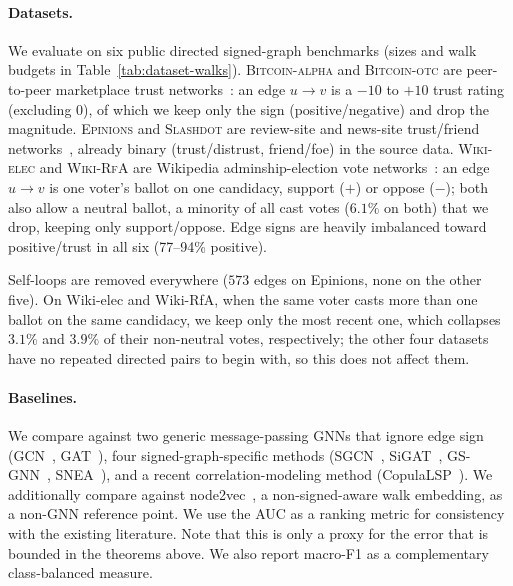 \documentclass[sigconf, review, anonymous]{acmart}
\theoremstyle{plain}
\theoremstyle{definition}
\begin{document}
\paragraph{Datasets.} We evaluate on six public directed signed-graph benchmarks (sizes and walk budgets in Table~\ref{tab:dataset-walks}). \textsc{Bitcoin-alpha} and \textsc{Bitcoin-otc} are peer-to-peer marketplace trust networks~\citep{kumar2016edge, kumar2018rev2}: an edge $u\to v$ is a $-10$ to $+10$ trust rating (excluding $0$), of which we keep only the sign (positive/negative) and drop the magnitude. \textsc{Epinions} and \textsc{Slashdot} are review-site and news-site trust/friend networks~\citep{leskovec2010signed}, already binary (trust/distrust, friend/foe) in the source data. \textsc{Wiki-elec} and \textsc{Wiki-RfA} are Wikipedia adminship-election vote networks~\citep{leskovec2010signed, leskovec2010predicting, west2014exploiting}: an edge $u\to v$ is one voter's ballot on one candidacy, support ($+$) or oppose ($-$); both also allow a neutral ballot, a minority of all cast votes ($6.1\%$ on both) that we drop, keeping only support/oppose. Edge signs are heavily imbalanced toward positive/trust in all six (77--94\% positive).

Self-loops are removed everywhere ($573$ edges on Epinions, none on the other five). On Wiki-elec and Wiki-RfA, when the same voter casts more than one ballot on the same candidacy, we keep only the most recent one, which collapses $3.1\%$ and $3.9\%$ of their non-neutral votes, respectively; the other four datasets have no repeated directed pairs to begin with, so this does not affect them.

\paragraph{Baselines.} We compare against two generic message-passing GNNs that ignore edge sign (GCN~\citep{kipf2017semi}, GAT~\citep{velickovic2018graph}), four signed-graph-specific methods (SGCN~\citep{derr2018signed}, SiGAT~\citep{huang2019signed}, GS-GNN~\citep{liu2021signed}, SNEA~\citep{li2020learning}), and a recent correlation-modeling method (CopulaLSP~\citep{sung2026scalable}). We additionally compare against node2vec~\citep{grover2016node2vec}, a non-signed-aware walk embedding, as a non-GNN reference point. We use the AUC as a ranking metric for consistency with the existing literature. Note that this is only a proxy for the error that is bounded in the theorems above. We also report macro-F1 as a complementary class-balanced measure.
\end{document}
